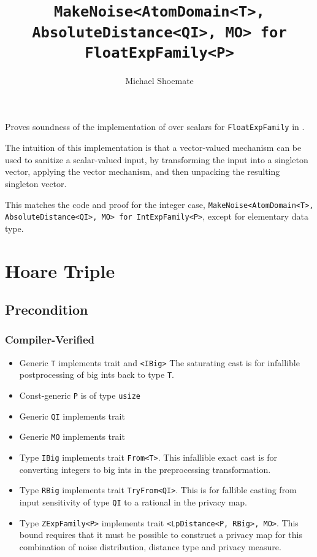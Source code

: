 \documentclass{article}
\title{\texttt{MakeNoise<AtomDomain<T>, AbsoluteDistance<QI>, MO> for FloatExpFamily<P>}}
\author{Michael Shoemate}
\date{}
\begin{document}
\maketitle

\contrib
Proves soundness of the implementation of  over scalars
for \texttt{FloatExpFamily} in .

The intuition of this implementation is that a vector-valued mechanism can be used to sanitize a scalar-valued input,
by transforming the input into a singleton vector, 
applying the vector mechanism, and then unpacking the resulting singleton vector.

This matches the code and proof for the integer case, \texttt{MakeNoise<AtomDomain<T>, AbsoluteDistance<QI>, MO> for IntExpFamily<P>},
except for elementary data type.

\section{Hoare Triple}
\subsection*{Precondition}
\subsubsection*{Compiler-Verified}

\begin{itemize}
    \item Generic \texttt{T} implements trait  and \texttt{<IBig>}
        The saturating cast is for infallible postprocessing of big ints back to type \texttt{T}.
    \item Const-generic \texttt{P} is of type \texttt{usize}
    \item Generic \texttt{QI} implements trait 
    \item Generic \texttt{MO} implements trait 
    \item Type \texttt{IBig} implements trait \texttt{From<T>}.
        This infallible exact cast is for converting integers to big ints in the preprocessing transformation.
    \item Type \texttt{RBig} implements trait \texttt{TryFrom<QI>}.
        This is for fallible casting from input sensitivity of type \texttt{QI} to a rational in the privacy map.
    \item Type \texttt{ZExpFamily<P>} implements trait \texttt{<LpDistance<P, RBig>, MO>}.
        This bound requires that it must be possible to construct a privacy map for this combination of noise distribution, distance type and privacy measure.
\end{itemize}
\end{document}

